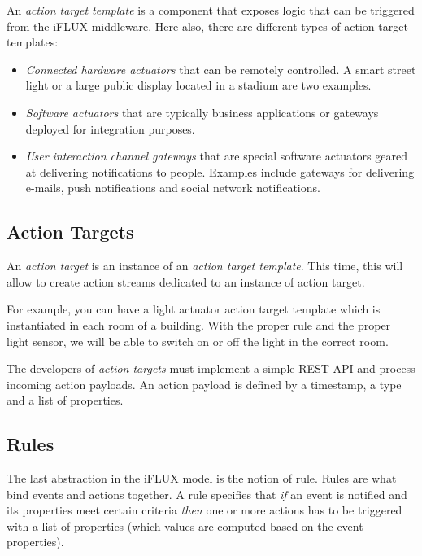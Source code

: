 An \emph{action target template} is a component that exposes logic that can be triggered from the iFLUX middleware. Here also, there are different types of action target templates:

\begin{itemize}
\item \emph{Connected hardware actuators} that can be remotely controlled. A smart street light or a large public display located in a stadium are two examples.
\item \emph{Software actuators} that are typically business applications or gateways deployed for integration purposes.
\item \emph{User interaction channel gateways} that are special software actuators geared at delivering notifications to people. Examples include gateways for delivering e-mails, push notifications and social network notifications.
\end{itemize}

\subsection{Action Targets}
\label{sec:at}

An \emph{action target} is an instance of an \emph{action target template}. This time, this will allow to create action streams dedicated to an instance of action target.

For example, you can have a light actuator action target template which is instantiated in each room of a building. With the proper rule and the proper light sensor, we will be able to switch on or off the light in the correct room.

The developers of \emph{action targets} must implement a simple REST API and process incoming action payloads. An action payload is defined by a timestamp, a type and a list of properties.

\subsection{Rules}
\label{sec:rules}

The last abstraction in the iFLUX model is the notion of rule. Rules are what bind events and actions together. A rule specifies that \emph{if} an event is notified and its properties meet certain criteria \emph{then} one or more actions has to be triggered with a list of properties (which values are computed based on the event properties).